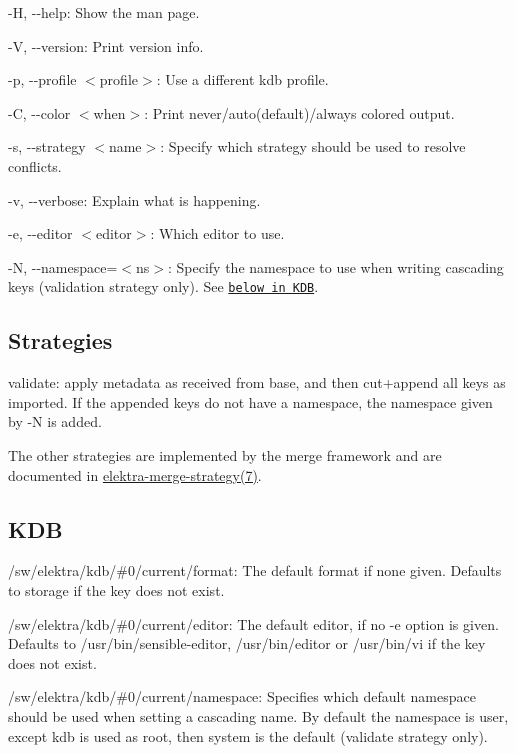 \begin{DoxyItemize}
\item {\ttfamily -\/H}, {\ttfamily -\/-\/help}\+: Show the man page.
\item {\ttfamily -\/V}, {\ttfamily -\/-\/version}\+: Print version info.
\item {\ttfamily -\/p}, {\ttfamily -\/-\/profile $<$profile$>$}\+: Use a different kdb profile.
\item {\ttfamily -\/C}, {\ttfamily -\/-\/color $<$when$>$}\+: Print never/auto(default)/always colored output.
\item {\ttfamily -\/s}, {\ttfamily -\/-\/strategy $<$name$>$}\+: Specify which strategy should be used to resolve conflicts.
\item {\ttfamily -\/v}, {\ttfamily -\/-\/verbose}\+: Explain what is happening.
\item {\ttfamily -\/e}, {\ttfamily -\/-\/editor $<$editor$>$}\+: Which editor to use.
\item {\ttfamily -\/N}, {\ttfamily -\/-\/namespace}=$<$ns$>$\+: Specify the namespace to use when writing cascading keys ({\ttfamily validation} strategy only). See \href{#KDB}{\tt below in K\+DB}.
\end{DoxyItemize}

\subsection*{Strategies}


\begin{DoxyItemize}
\item {\ttfamily validate}\+: apply metadata as received from base, and then cut+append all keys as imported. If the appended keys do not have a namespace, the namespace given by {\ttfamily -\/N} is added.
\end{DoxyItemize}

The other strategies are implemented by the merge framework and are documented in \hyperlink{md_doc_help_elektra-merge-strategy_doc_help_elektra-merge-strategy_md}{elektra-\/merge-\/strategy(7)}.

\subsection*{K\+DB}


\begin{DoxyItemize}
\item {\ttfamily /sw/elektra/kdb/\#0/current/format}\+: The default format if none given. Defaults to {\ttfamily storage} if the key does not exist.
\item {\ttfamily /sw/elektra/kdb/\#0/current/editor}\+: The default editor, if no {\ttfamily -\/e} option is given. Defaults to {\ttfamily /usr/bin/sensible-\/editor}, {\ttfamily /usr/bin/editor} or {\ttfamily /usr/bin/vi} if the key does not exist.
\item {\ttfamily /sw/elektra/kdb/\#0/current/namespace}\+: Specifies which default namespace should be used when setting a cascading name. By default the namespace is user, except {\ttfamily kdb} is used as root, then {\ttfamily system} is the default ({\ttfamily validate} strategy only).
\end{DoxyItemize}

